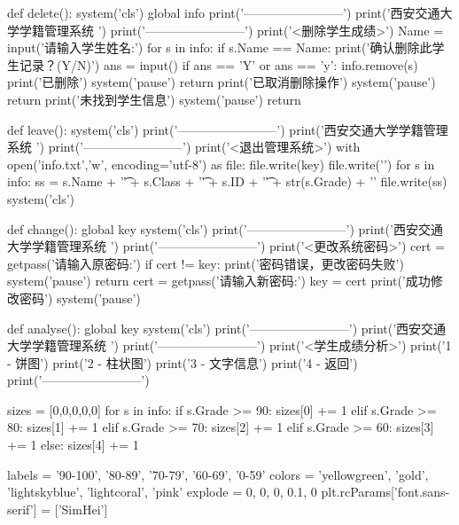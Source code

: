\documentclass{article}
\begin{document}
\begin{python}
def delete():
    system('cls')
    global info
    print('------------------------')
    print('西安交通大学学籍管理系统     ')
    print('------------------------')
    print('<删除学生成绩>')
    Name = input('请输入学生姓名:')
    for s in info:
        if s.Name == Name:
            print('确认删除此学生记录？(Y/N)')
            ans = input()
            if ans == 'Y' or ans == 'y':
                info.remove(s)
                print('已删除')
                system('pause')
                return
            print('已取消删除操作')
            system('pause')
            return
    print('未找到学生信息')
    system('pause')
    return

def leave():
    system('cls')
    print('------------------------')
    print('西安交通大学学籍管理系统     ')
    print('------------------------')
    print('<退出管理系统>')
    with open('info.txt','w', encoding='utf-8') as file:
        file.write(key)
        file.write('\n')
        for s in info:
            ss = s.Name + '\t' + s.Class + '\t' + s.ID + '\t' + str(s.Grade) + '\n'
            file.write(ss)
    system('cls')

def change():
    global key
    system('cls')
    print('------------------------')
    print('西安交通大学学籍管理系统     ')
    print('------------------------')
    print('<更改系统密码>')
    cert = getpass('请输入原密码:')
    if cert != key:
        print('密码错误，更改密码失败')
        system('pause')
        return
    cert = getpass('请输入新密码:')
    key = cert
    print('成功修改密码')
    system('pause')

def analyse():
    global key
    system('cls')
    print('------------------------')
    print('西安交通大学学籍管理系统     ')
    print('------------------------')
    print('<学生成绩分析>')
    print('1 - 饼图')
    print('2 - 柱状图')
    print('3 - 文字信息')
    print('4 - 返回')
    print('------------------------')

    sizes = [0,0,0,0,0]
    for s in info:
        if s.Grade >= 90:
            sizes[0] += 1
        elif s.Grade >= 80:
            sizes[1] += 1
        elif s.Grade >= 70:
            sizes[2] += 1
        elif s.Grade >= 60:
            sizes[3] += 1
        else:
            sizes[4] += 1

    labels = '90-100', '80-89', '70-79', '60-69', '0-59'
    colors = 'yellowgreen', 'gold', 'lightskyblue', 'lightcoral', 'pink'
    explode = 0, 0, 0, 0.1, 0
    plt.rcParams['font.sans-serif'] = ['SimHei']


\end{python}
\end{document}
